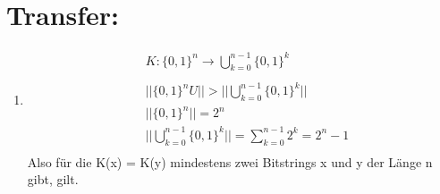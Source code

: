         \section*{Transfer:}
    \begin{enumerate}[label=(\alph*)]
    \item 
    	    \begin{align*}
    	&K:\{0,1\}^n \rightarrow \bigcup _{k=0}^{n-1} \{0,1\}^k  \\
    	\\
        	&||\{0,1\}^n U|| > || \bigcup _{k=0}^{n-1} \{0,1\}^k|| \\
        	&||\{0,1\}^n|| = 2^n \tag{Korollar 1.8}\\
        	&|| \bigcup _{k=0}^{n-1} \{0,1\}^k|| = \sum_{k=0}^{n-1}2^k=2^n-1 \tag{Theorem 1.20}\\
        \end{align*}
        Also für die K(x) = K(y) mindestens zwei Bitstrings x und y der Länge n gibt,  gilt.
        \end{enumerate}







